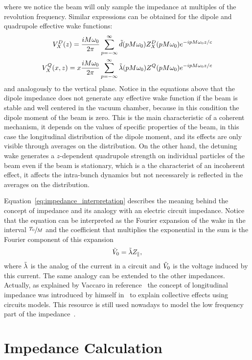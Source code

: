    where we notice the beam will only sample the impedance at multiples of the revolution frequency. Similar expressions can be obtained for the dipole and quadrupole effective wake functions:
    \begin{align}
  		V^D_X(z) = \frac{iM\omega_0}{2\pi} \sum_{p=-\infty}^\infty \tilde{d}(pM\omega_0)Z^D_X(pM\omega_0)e^{-ipM\omega_0 z/c}\\
		V^Q_X(x,z) = x\frac{iM\omega_0}{2\pi} \sum_{p=-\infty}^\infty \tilde{\lambda}(pM\omega_0)Z^Q(pM\omega_0)e^{-ipM\omega_0 z/c}
    \end{align}
    and analogously to the vertical plane. Notice in the equations above that the dipole impedance does not generate any effective wake function if the beam is stable and well centered in the vacuum chamber, because in this condition the dipole moment of the beam is zero. This is the main characteristic of a coherent mechanism, it depends on the values of specific properties of the beam, in this case the longitudinal distribution of the dipole moment, and its effects are only visible through averages on the distribution. On the other hand, the detuning wake generates a $z$-dependent quadrupole strength on individual particles of the beam even if the beam is stationary, which is a the characterist of an incoherent effect, it affects the intra-bunch dynamics but not necessarely is reflected in the averages on the distribution.

    Equation~\eqref{eq:impedance_interpretation} describes the meaning behind the concept of impedance and its analogy with an electric circuit impedance. Notice that the equation can be interpreted as the Fourier expansion of the wake in the interval $\sfrac{T_0}{M}$ and the coefficient that multiplies the exponential in the sum is the Fourier component of this expansion
    \begin{align}
  	  	\tilde{V}_0 = \tilde{\lambda}Z_\parallel,
    \end{align}
    where $\tilde{\lambda}$ is the analog of the current in a circuit and $\tilde{V}_0$ is the voltage induced by this current. The same analogy can be extended to the other impedances. Actually, as explained by Vaccaro in reference~\cite{vaccaro_novo} the concept of longitudinal impedance was introduced by himself in~\cite{vaccaro_velho} to explain collective effects using circuits models. This resource is still used nowadays to model the low frequency part of the impedance~\cite{davino, zotter}.

\section{Impedance Calculation}

